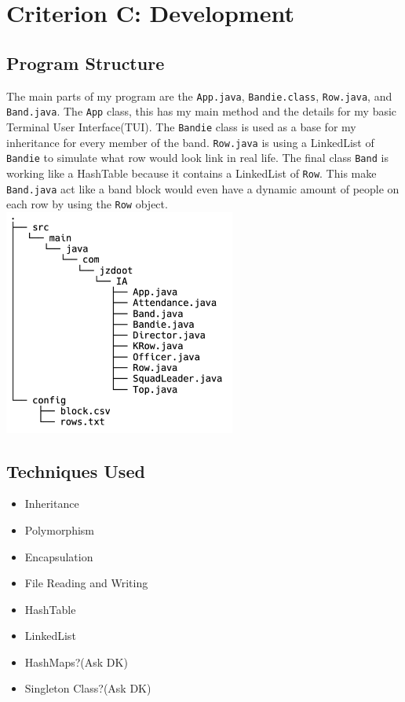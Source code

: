 \documentclass{article}
\begin{document}
\section{Criterion C: Development}
\subsection{Program Structure}
The main parts of my program are the \verb|App.java|, \verb|Bandie.class|, \verb|Row.java|, and \verb|Band.java|. The \verb|App| class, this has my main method and the details for my basic Terminal User Interface(TUI). The \verb|Bandie| class is used as a base for my inheritance for every member of the band. \verb|Row.java| is using a LinkedList\cite{linkedList} of \verb|Bandie| to simulate what row would look link in real life. The final class \verb|Band| is working like a HashTable\cite{hashTable} because it contains a LinkedList\cite{linkedList} of \verb|Row|. This make \verb|Band.java| act like a band block would even have a dynamic amount of people on each row by using the \verb|Row| object.\\
\includegraphics[width=3in]{fileStructure.png}
\subsection{Techniques Used}
\begin{itemize}
	\item Inheritance
	\item Polymorphism
	\item Encapsulation
	\item File Reading and Writing
	\item HashTable\cite{hashTable}
	\item LinkedList\cite{linkedList}
	\item HashMaps\cite{hashMap}?(Ask DK)%
	\item Singleton Class?(Ask DK)%
\end{itemize}
\end{document}
